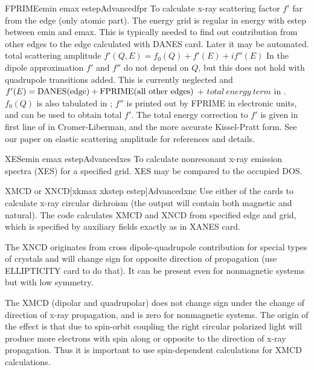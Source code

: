 \documentclass[11pt,oneside]{report} %
\begin{document}
\begin{Card}{FPRIME}{emin  emax estep}{Advanced}{fpr}
  To calculate x-ray scattering factor $f'$ far from the edge
   (only atomic part).
  The energy grid is regular in energy with estep between emin and emax.
  This is typically needed to find out contribution from other edges
  to the edge calculated with DANES card. Later it may be automated.
  total scattering amplitude  $f'(Q,E) = f_0(Q) + f'(E) +if''(E)$
  In the dipole approximation $f'$ and $f''$ do not depend on $Q$, but
  this does not
  hold with quadrupole transitions added. This is currently neglected
  and $f'(E)={\rm DANES(edge)+FPRIME(all\ other\ edges)}$ +
  $total\ energy\ term$
  in . $f_0(Q)$ is also tabulated in ;
  $f''$ is printed out
  by FPRIME in electronic units, and can be used to obtain total $f'$.
  The total energy correction to $f'$ is given in first line of
  in Cromer-Liberman, and the more accurate Kissel-Pratt form. See our paper
  on elastic scattering amplitude for references and details.
\end{Card}

\begin{Card}{XES}{emin  emax estep}{Advanced}{xes}
  To calculate nonresonant x-ray emission spectra (XES) for a specified
  grid. XES may be compared to the occupied DOS.
\end{Card}

\begin{Card}{XMCD or XNCD}{[xkmax xkstep estep]}{Advanced}{xnc}
  Use either of the cards to calculate x-ray circular dichroism
  (the output will contain both magnetic and natural).
  The code calculates XMCD and XNCD from specified
  edge and grid, which is specified by auxiliary fields exactly as in XANES card.

  The XNCD  originates from cross dipole-quadrupole contribution
 for special types of crystals and will change sign for opposite
 direction of propagation (use ELLIPTICITY card to do that). It 
 can be present even for nonmagnetic systems but with low symmetry.

 The XMCD (dipolar and quadrupolar) does not change sign under the
change of direction of x-ray propagation, and is zero for nonmagnetic
systems. The origin of the effect is that due to spin-orbit coupling
the right circular polarized light will produce more electrons
with spin along or opposite to the direction of x-ray propagation.
Thus it is important to use spin-dependent calculations for XMCD
calculations. 
\end{Card}
 
\end{document}
